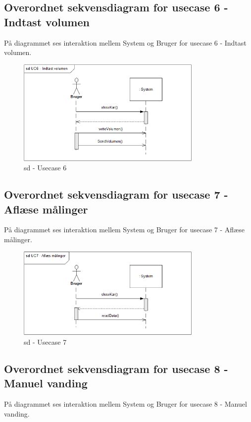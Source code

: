 \subsection*{Overordnet sekvensdiagram for usecase 6 - Indtast volumen}
På diagrammet ses interaktion mellem System og Bruger for usecase 6 - Indtast volumen.

\begin{figure}[H]
    \centering
    \includegraphics[width=0.8\textwidth]{Systemarkitektur/OverordnedeSekvensdiagrammer/sd_UC6.png}
    \caption{sd - Usecase 6}
    \label{fig:sd_UC6}
\end{figure}

\subsection*{Overordnet sekvensdiagram for usecase 7 - Aflæse målinger}
På diagrammet ses interaktion mellem System og Bruger for usecase 7 - Aflæse målinger.

\begin{figure}[H]
    \centering
    \includegraphics[width=0.8\textwidth]{Systemarkitektur/OverordnedeSekvensdiagrammer/sd_UC7.png}
    \caption{sd - Usecase 7}
    \label{fig:sd_UC6}
\end{figure}

\subsection*{Overordnet sekvensdiagram for usecase 8 - Manuel vanding}
På diagrammet ses interaktion mellem System og Bruger for usecase 8 - Manuel vanding.

